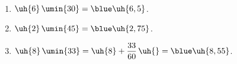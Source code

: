    \ \\ [-5mm]
   \begin{enumerate}
      \item $\uh{6}\,\umin{30} =\blue \uh{6,5}$.
      \item $\uh{2}\,\umin{45} =\blue \uh{2,75}$. \smallskip
      \item $\uh{8}\,\umin{33} =\uh{8}+\dfrac{33}{60}\,\uh{} =\blue \uh{8,55}$.
   \end{enumerate}
